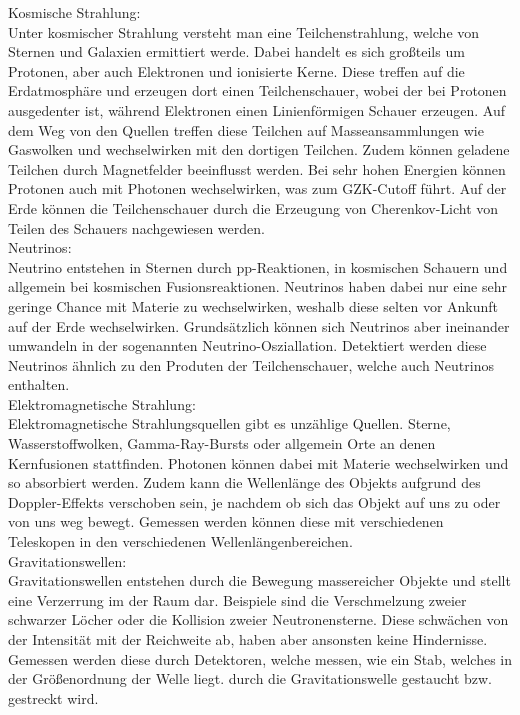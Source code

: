 Kosmische Strahlung:\\
Unter kosmischer Strahlung versteht man eine Teilchenstrahlung, welche von Sternen und Galaxien 
ermittiert werde. Dabei handelt es sich großteils um Protonen, aber auch Elektronen und ionisierte
Kerne. Diese treffen auf die Erdatmosphäre und erzeugen dort einen Teilchenschauer,
wobei der bei Protonen ausgedenter ist, während Elektronen einen Linienförmigen Schauer
erzeugen. Auf dem Weg von den Quellen treffen diese Teilchen auf Masseansammlungen
wie Gaswolken und wechselwirken mit den dortigen Teilchen. Zudem können geladene
Teilchen durch Magnetfelder beeinflusst werden. Bei sehr hohen Energien können
Protonen auch mit Photonen wechselwirken, was zum GZK-Cutoff führt.
Auf der Erde können die Teilchenschauer durch die Erzeugung von Cherenkov-Licht
von Teilen des Schauers nachgewiesen werden.\\

Neutrinos:\\
Neutrino entstehen in Sternen durch pp-Reaktionen, in kosmischen Schauern und
allgemein bei kosmischen Fusionsreaktionen. Neutrinos haben dabei nur eine sehr geringe
Chance mit Materie zu wechselwirken, weshalb diese selten vor Ankunft auf der Erde
wechselwirken. Grundsätzlich können sich Neutrinos aber ineinander umwandeln
in der sogenannten Neutrino-Osziallation. Detektiert werden diese Neutrinos
ähnlich zu den Produten der Teilchenschauer, welche auch Neutrinos enthalten.\\

Elektromagnetische Strahlung:\\
Elektromagnetische Strahlungsquellen gibt es unzählige Quellen. Sterne, Wasserstoffwolken,
Gamma-Ray-Bursts
oder allgemein Orte an denen Kernfusionen stattfinden. Photonen können dabei mit Materie
wechselwirken und so absorbiert werden. Zudem kann die Wellenlänge des Objekts aufgrund
des Doppler-Effekts verschoben sein, je nachdem ob sich das Objekt auf uns zu oder von uns weg
bewegt. Gemessen werden können diese mit verschiedenen Teleskopen in den verschiedenen
Wellenlängenbereichen.\\


Gravitationswellen:\\
Gravitationswellen entstehen durch die Bewegung massereicher Objekte und stellt
eine Verzerrung im der Raum dar. Beispiele sind die Verschmelzung zweier
schwarzer Löcher oder die Kollision zweier Neutronensterne. Diese schwächen von der
Intensität mit der Reichweite ab, haben aber ansonsten keine Hindernisse. Gemessen
werden diese durch Detektoren, welche messen, wie ein Stab,
welches in der Größenordnung der Welle liegt.  durch die Gravitationswelle
gestaucht bzw. gestreckt wird. \\

